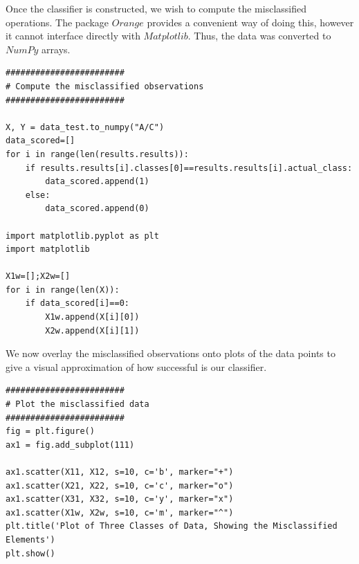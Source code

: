 \begin{flushleft}Once the classifier is constructed, we wish to compute the misclassified operations. The package $Orange$ provides a convenient way of doing this, however it cannot interface directly with $Matplotlib$. Thus, the data was converted to $NumPy$ arrays.
\end{flushleft}

\begin{lstlisting}[caption={Compute the Misclassified Observations},label=2nd,firstnumber=115]
########################
# Compute the misclassified observations
########################

X, Y = data_test.to_numpy("A/C")
data_scored=[]
for i in range(len(results.results)):
    if results.results[i].classes[0]==results.results[i].actual_class:
        data_scored.append(1)
    else:
        data_scored.append(0)

import matplotlib.pyplot as plt
import matplotlib

X1w=[];X2w=[]
for i in range(len(X)):
    if data_scored[i]==0:
        X1w.append(X[i][0])
        X2w.append(X[i][1])
\end{lstlisting}

\begin{flushleft}We now overlay the misclassified observations onto plots of the data points to give a visual approximation of how successful is our classifier.
\end{flushleft}

\begin{lstlisting}[caption={Compute the Misclassified Observations},label=2nd,firstnumber=123]
########################
# Plot the misclassified data
########################
fig = plt.figure()
ax1 = fig.add_subplot(111)

ax1.scatter(X11, X12, s=10, c='b', marker="+")
ax1.scatter(X21, X22, s=10, c='c', marker="o")
ax1.scatter(X31, X32, s=10, c='y', marker="x")
ax1.scatter(X1w, X2w, s=10, c='m', marker="^")
plt.title('Plot of Three Classes of Data, Showing the Misclassified Elements')
plt.show()
\end{lstlisting}

